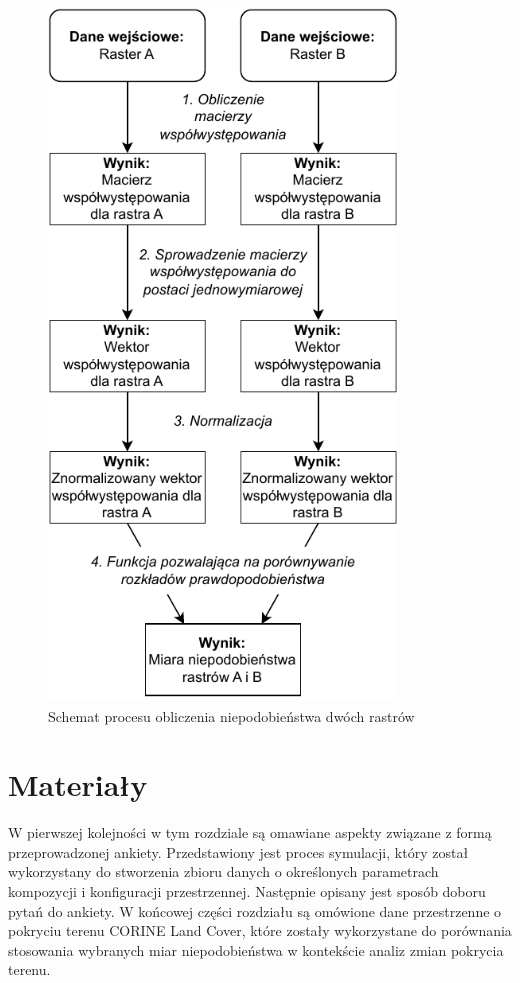 \documentclass{amuthesis}
\begin{document}
\begin{figure}[t]

{\centering \includegraphics[width=3.64583in,height=7.23958in]{figures/diagram_raster_comparison.pdf}

}

\caption{\label{fig-schemat-porownanie}Schemat procesu obliczenia
niepodobieństwa dwóch rastrów}

\end{figure}


\hypertarget{sec-materialy}{%
\chapter{Materiały}\label{sec-materialy}}

W pierwszej kolejności w tym rozdziale są omawiane aspekty związane z
formą przeprowadzonej ankiety. Przedstawiony jest proces symulacji,
który został wykorzystany do stworzenia zbioru danych o określonych
parametrach kompozycji i konfiguracji przestrzennej. Następnie opisany
jest sposób doboru pytań do ankiety. W końcowej części rozdziału są
omówione dane przestrzenne o pokryciu terenu CORINE Land Cover, które
zostały wykorzystane do porównania stosowania wybranych miar
niepodobieństwa w kontekście analiz zmian pokrycia terenu.
\end{document}
